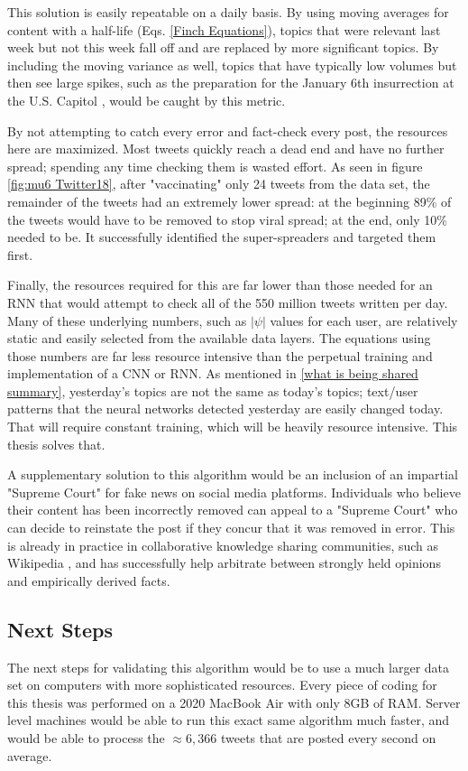 \documentclass[preprint,review,12pt]{elsarticle}
\begin{document}
This solution is easily repeatable on a daily basis. By using moving averages for content with a half-life (Eqs. \ref{Finch Equations}), topics that were relevant last week but not this week fall off and are replaced by more significant topics. By including the moving variance as well, topics that have typically low volumes but then see large spikes, such as the preparation for the January 6th insurrection at the U.S. Capitol \cite{Levenson2021capitol}, would be caught by this metric. 

By not attempting to catch every error and fact-check every post, the resources here are maximized. Most tweets quickly reach a dead end and have no further spread; spending any time checking them is wasted effort. As seen in figure \ref{fig:mu6 Twitter18}, after "vaccinating" only 24 tweets from the data set, the remainder of the tweets had an extremely lower spread: at the beginning 89\% of the tweets would have to be removed to stop viral spread; at the end, only 10\% needed to be. It successfully identified the super-spreaders and targeted them first.

Finally, the resources required for this are far lower than those needed for an RNN that would attempt to check all of the 550 million tweets written per day. Many of these underlying numbers, such as $|\psi|$ values for each user, are relatively static and easily selected from the available data layers. The equations using those numbers are far less resource intensive than the perpetual training and implementation of a CNN or RNN. As mentioned in \ref{what is being shared summary}, yesterday's topics are not the same as today's topics; text/user patterns that the neural networks detected yesterday are easily changed today. That will require constant training, which will be heavily resource intensive. This thesis solves that.

A supplementary solution to this algorithm would be an inclusion of an impartial "Supreme Court" for fake news on social media platforms. Individuals who believe their content has been incorrectly removed can appeal to a "Supreme Court" who can decide to reinstate the post if they concur that it was removed in error. This is already in practice in collaborative knowledge sharing communities, such as Wikipedia \cite{hara2016co}, and has successfully help arbitrate between strongly held opinions and empirically derived facts. 

\subsection{Next Steps}
The next steps for validating this algorithm would be to use a much larger data set on computers with more sophisticated resources. Every piece of coding for this thesis was performed on a 2020 MacBook Air with only 8GB of RAM. Server level machines would be able to run this exact same algorithm much faster, and would be able to process the $\approx 6,366$ tweets that are posted every second on average. 
\end{document}
